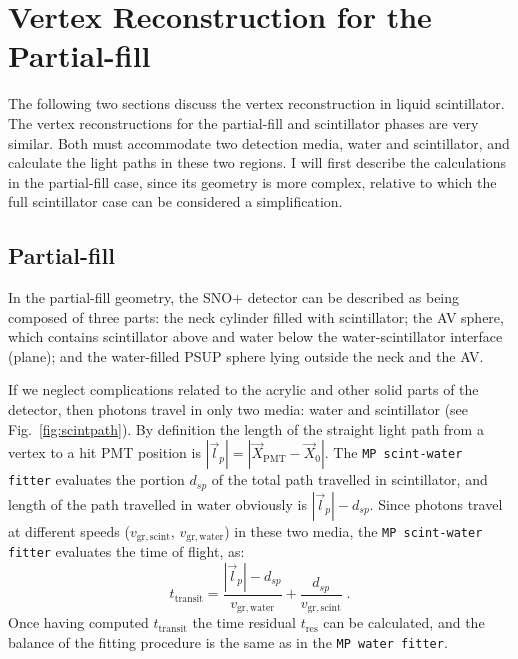 \section{Vertex Reconstruction for the Partial-fill}\label{sect:partialFitter}

The following two sections discuss the vertex reconstruction in liquid scintillator. The vertex reconstructions for the partial-fill and scintillator phases are very similar. Both must accommodate two detection media, water and scintillator, and calculate the light paths in these two regions. I will first describe the calculations in the partial-fill case, since its geometry is more complex, relative to which the full scintillator case can be considered a simplification.

\subsection{Partial-fill}

In the partial-fill geometry, the SNO+ detector can be described as being composed of three parts: the neck cylinder filled with scintillator; the AV sphere, which contains scintillator above and water below the water-scintillator interface (plane); and the water-filled PSUP sphere lying outside the neck and the AV.

If we neglect complications related to the acrylic and other solid parts of the detector, then photons travel in only two media: water and scintillator (see Fig.~\ref{fig:scintpath}). By definition the length of the straight light path from a vertex to a hit PMT position is $|\vec{l}_p|=|\vec{X}_\mathrm{PMT}-\vec{X}_0|$. The \texttt{MP scint-water fitter} evaluates the portion $d_{sp}$ of the total path travelled in scintillator, and length of the path travelled in water obviously is $|\vec{l}_p|-d_{sp}$. Since photons travel at different speeds ($v_\mathrm{gr,scint}$, $v_\mathrm{gr,water}$) in these two media, the \texttt{MP scint-water fitter} evaluates the time of flight, as:
\begin{equation}
t_{\mathrm{transit}} = \frac{|\vec{l}_p|-d_{sp}}{v_\mathrm{gr,water}} +\frac{d_{sp}}{v_\mathrm{gr,scint}} \; .
\end{equation}
Once having computed $t_{\mathrm{transit}}$ the time residual $t_\mathrm{res}$ can be calculated, and the balance of the fitting procedure is the same as in the \texttt{MP water fitter}.

